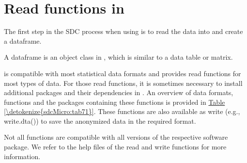 \documentclass[letterpaper,10pt,english]{sphinxmanual}
\begin{document}
\section{Read functions in }
\label{\detokenize{sdcMicro:read-functions-in-r}}
The first step in the SDC process when using  is to read the
data into  and create a dataframe. %
\begin{footnote}[2]\sphinxAtStartFootnote
A dataframe is an object class in , which is similar to a data
table or matrix.
%
\end{footnote}  is
compatible with most statistical data formats and provides read
functions for most types of data. For those read functions, it is
sometimes necessary to install additional packages and their
dependencies in . An overview of data formats, functions and the
packages containing these functions is provided in \hyperref[\detokenize{sdcMicro:tab71}]{Table \ref{\detokenize{sdcMicro:tab71}}}. These
functions are also available as write (e.g., write.dta()) to save the
anonymized data in the required format. %
\begin{footnote}[3]\sphinxAtStartFootnote
Not all functions are compatible with all versions of the respective
software package. We refer to the help files of the read and write
functions for more information.
%
\end{footnote}
\end{document}
